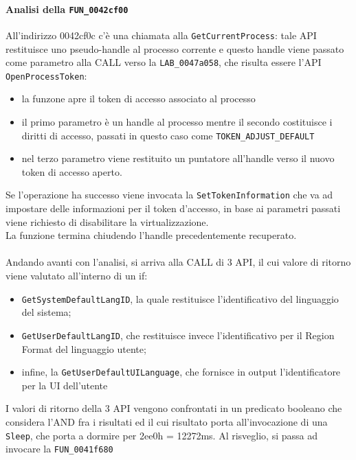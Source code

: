 \documentclass[12pt]{extarticle}
\begin{document}
\paragraph{Analisi della \texttt{FUN\_0042cf00}}
All'indirizzo  0042cf0c c'è una chiamata alla \texttt{GetCurrentProcess}: tale API restituisce uno pseudo-handle al processo corrente e questo handle viene passato come parametro alla CALL verso la \texttt{LAB\_0047a058}, che risulta essere l'API \texttt{OpenProcessToken}:
\begin{itemize}
    \item la funzone apre il token di accesso associato al processo
    \item il primo parametro è un handle al processo mentre il secondo costituisce i diritti di accesso, passati in questo caso come \texttt{TOKEN\_ADJUST\_DEFAULT}
    \item nel terzo parametro viene restituito un puntatore all'handle verso il nuovo token di accesso aperto.
\end{itemize}
Se l'operazione ha successo viene invocata la \texttt{SetTokenInformation} che va ad impostare delle informazioni per il token d'accesso, in base ai parametri passati viene richiesto di disabilitare la virtualizzazione.\\La funzione termina chiudendo l'handle precedentemente recuperato.\\\\Andando avanti con l'analisi, si arriva alla CALL di 3 API, il cui valore di ritorno viene valutato all'interno di un if:
\begin{itemize}
    \item \texttt{GetSystemDefaultLangID}, la quale  restituisce l'identificativo del linguaggio del sistema; 
    \item \texttt{GetUserDefaultLangID}, che restituisce invece l'identificativo per il Region Format del linguaggio utente; 
    \item infine, la \texttt{GetUserDefaultUILanguage}, che fornisce in output l'identificatore per la UI dell'utente
\end{itemize}
I valori di ritorno della 3 API vengono confrontati in un predicato booleano che considera l'AND fra i risultati ed il cui risultato porta all'invocazione di una \texttt{Sleep}, che porta a dormire per 2ee0h = 12272ms. Al risveglio, si passa ad invocare la \texttt{FUN\_0041f680} 
\end{document}
